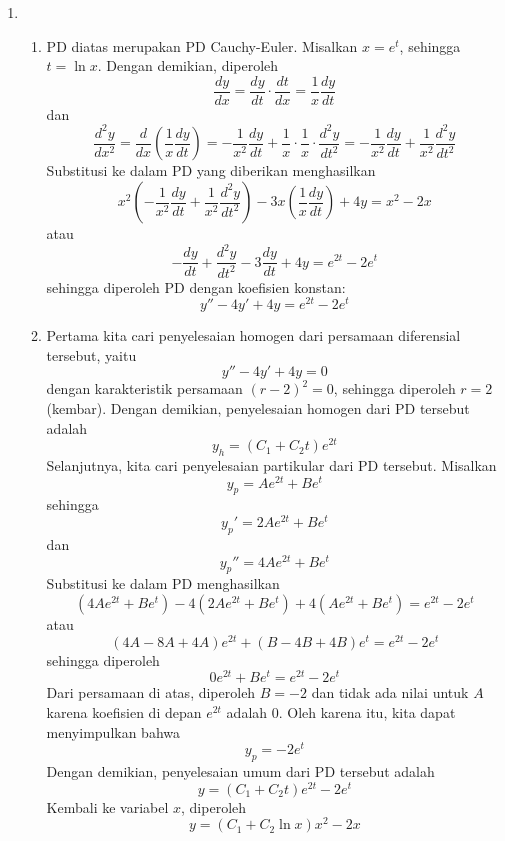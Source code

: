 \documentclass[10pt,openany,a4paper]{article}
\begin{document}
\begin{enumerate}
  \item \begin{enumerate}
          \item PD diatas merupakan PD Cauchy-Euler. Misalkan $x = e^t$, sehingga $t = \ln x$. Dengan demikian, diperoleh
                \[
                  \dfrac{dy}{dx} = \dfrac{dy}{dt} \cdot \dfrac{dt}{dx} = \dfrac{1}{x} \dfrac{dy}{dt}
                \]
                dan
                \[
                  \dfrac{d^2y}{dx^2} = \dfrac{d}{dx}\left(\dfrac{1}{x} \dfrac{dy}{dt}\right) = -\dfrac{1}{x^2} \dfrac{dy}{dt} + \dfrac{1}{x} \cdot \dfrac{1}{x} \cdot \dfrac{d^2y}{dt^2} = -\dfrac{1}{x^2} \dfrac{dy}{dt} + \dfrac{1}{x^2} \dfrac{d^2y}{dt^2}
                \]
                Substitusi ke dalam PD yang diberikan menghasilkan
                \[
                  x^2\left(-\dfrac{1}{x^2} \dfrac{dy}{dt} + \dfrac{1}{x^2} \dfrac{d^2y}{dt^2}\right) - 3x\left(\dfrac{1}{x} \dfrac{dy}{dt}\right) + 4y = x^2 - 2x
                \]
                atau
                \[
                  -\dfrac{dy}{dt} + \dfrac{d^2y}{dt^2} - 3\dfrac{dy}{dt} + 4y = e^{2t} - 2e^t
                \]
                sehingga diperoleh PD dengan koefisien konstan:
                \[
                  y'' - 4y' + 4y = e^{2t} - 2e^t
                \]
          \item Pertama kita cari penyelesaian homogen dari persamaan diferensial tersebut, yaitu
                \[
                  y'' - 4y' + 4y = 0
                \]
                dengan karakteristik persamaan $(r-2)^2 = 0$, sehingga diperoleh $r = 2$ (kembar). Dengan demikian, penyelesaian homogen dari PD tersebut adalah
                \[
                  y_h = (C_1 + C_2 t)e^{2t}
                \]
                Selanjutnya, kita cari penyelesaian partikular dari PD tersebut. Misalkan
                \[
                  y_p = Ae^{2t} + Be^t
                \]
                sehingga
                \[
                  y_p' = 2Ae^{2t} + Be^t
                \]
                dan
                \[
                  y_p'' = 4Ae^{2t} + Be^t
                \]
                Substitusi ke dalam PD menghasilkan
                \[
                  (4Ae^{2t} + Be^t) - 4(2Ae^{2t} + Be^t) + 4(Ae^{2t} + Be^t) = e^{2t} - 2e^t
                \]
                atau
                \[
                  (4A - 8A + 4A)e^{2t} + (B - 4B + 4B)e^t = e^{2t} - 2e^t
                \]
                sehingga diperoleh
                \[
                  0e^{2t} + Be^t = e^{2t} - 2e^t
                \]
                Dari persamaan di atas, diperoleh $B = -2$ dan tidak ada nilai untuk $A$ karena koefisien di depan $e^{2t}$ adalah 0. Oleh karena itu, kita dapat menyimpulkan bahwa
                \[
                  y_p = -2e^t
                \]
                Dengan demikian, penyelesaian umum dari PD tersebut adalah
                \[
                  y = (C_1 + C_2 t)e^{2t} - 2e^t
                \]
                Kembali ke variabel $x$, diperoleh
                \[
                  y = (C_1 + C_2 \ln x)x^2 - 2x
                \]
        \end{enumerate}
\end{enumerate}
\end{document}
